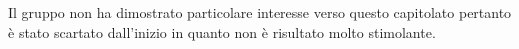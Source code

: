 Il gruppo non ha dimostrato particolare interesse verso questo capitolato pertanto è stato scartato dall'inizio in quanto non è risultato molto stimolante.